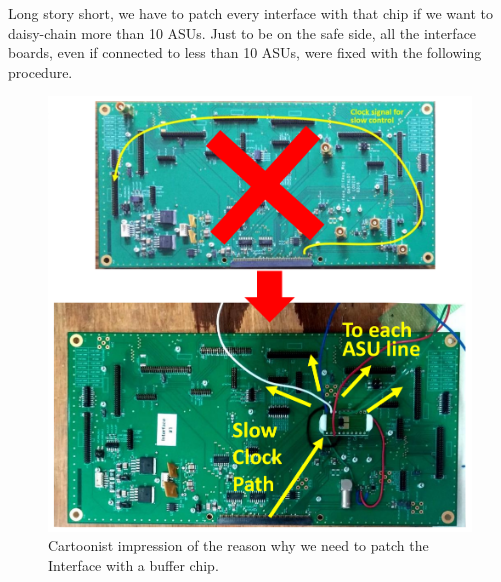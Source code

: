 Long story short, we have to patch every interface with that chip if we want to
daisy-chain more than 10 ASUs. Just to be on the safe side, all the interface
boards, even if connected to less than 10 ASUs, were fixed with the following
procedure.
\begin{figure}[H]
  \centering \includegraphics[width=.8\textwidth]{buffer-role}
  \caption{Cartoonist impression of the reason why we need to patch the
    Interface with a buffer chip.}\label{fig:buffer-role}
\end{figure}

